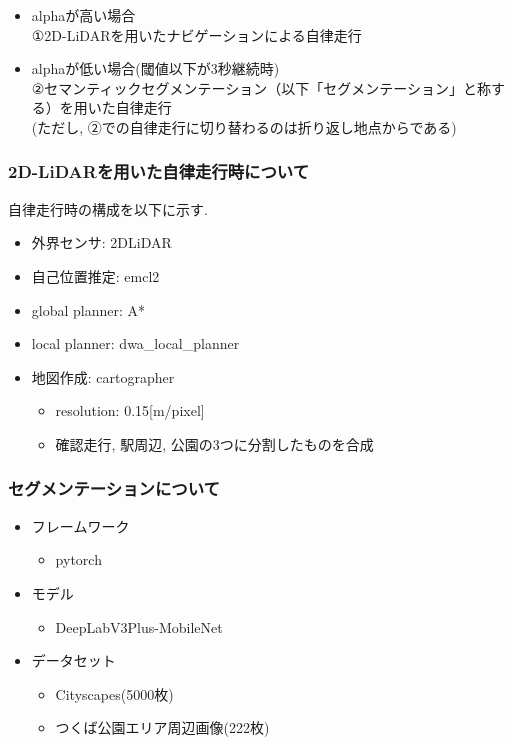 \documentclass[uplatex, twocolumn, 9pt]{jsproceedings}
\begin{document}
\newpage

\begin{itemize}
  \item alphaが高い場合\\
  ①2D-LiDARを用いたナビゲーションによる自律走行
  \item alphaが低い場合(閾値以下が3秒継続時)\\
  ②セマンティックセグメンテーション\cite{Deeplab}（以下「セグメンテーション」と称する）を用いた自律走行\\
  (ただし, ②での自律走行に切り替わるのは折り返し地点からである)
\end{itemize}

\subsubsection{2D-LiDARを用いた自律走行時について}
自律走行時の構成を以下に示す.
\begin{itemize}
  \item 外界センサ: 2DLiDAR
  \item 自己位置推定: emcl2
  \item global planner: A*
  \item local planner: dwa\_local\_planner
  \item 地図作成: cartographer
  \begin{itemize}
    \item resolution: 0.15[m/pixel]
    \item 確認走行, 駅周辺, 公園の3つに分割したものを合成
  \end{itemize}
\end{itemize}

\subsubsection{セグメンテーションについて}
\begin{itemize}
  \item フレームワーク
  \begin{itemize}
    \item pytorch
  \end{itemize}
\end{itemize}
\begin{itemize}
  \item モデル
  \begin{itemize}
    \item DeepLabV3Plus-MobileNet
  \end{itemize}
\end{itemize}
\begin{itemize}
  \item データセット
  \begin{itemize}
    \item Cityscapes\cite{cityscapes}(5000枚)
    \item つくば公園エリア周辺画像(222枚)
  \end{itemize}
\end{itemize}
\end{document}
